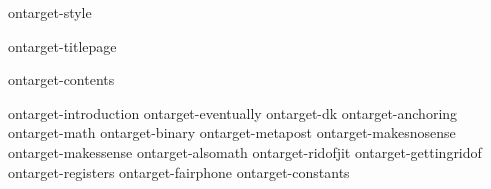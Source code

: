 
\environment ontarget-style

\dontcomplain

\startdocument

    \component ontarget-titlepage

    \startfrontmatter
        \component ontarget-contents
    \stopfrontmatter

    \startbodymatter
        \component ontarget-introduction
        \component ontarget-eventually
        \component ontarget-dk
        \component ontarget-anchoring
        \component ontarget-math
        \component ontarget-binary
        \component ontarget-metapost
        \component ontarget-makesnosense
        \component ontarget-makessense
        \component ontarget-alsomath
        \component ontarget-ridofjit
        \component ontarget-gettingridof
        \component ontarget-registers
        \component ontarget-fairphone
        \component ontarget-constants
    \stopbodymatter

\stopdocument

